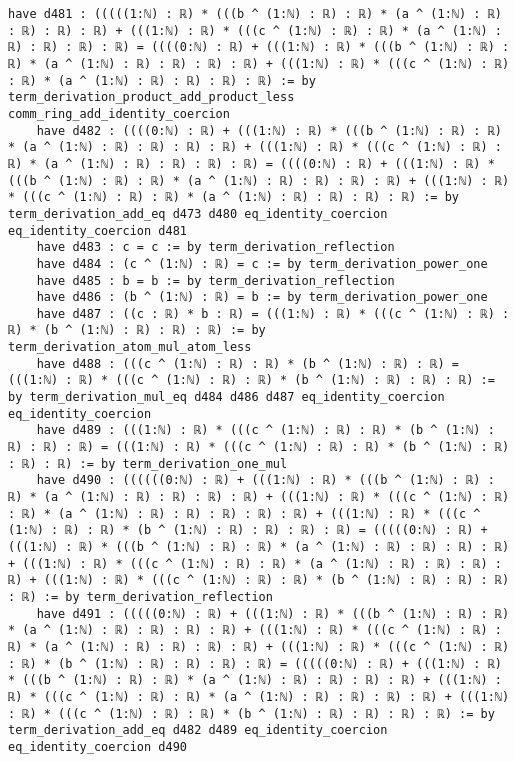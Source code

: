 \documentclass{article}
\begin{document}
\begin{tcolorbox}[colback=white!10, width=\linewidth]
\begin{lstlisting}[language=Lean4]
    have d481 : (((((1:ℕ) : ℝ) * (((b ^ (1:ℕ) : ℝ) : ℝ) * (a ^ (1:ℕ) : ℝ) : ℝ) : ℝ) : ℝ) + (((1:ℕ) : ℝ) * (((c ^ (1:ℕ) : ℝ) : ℝ) * (a ^ (1:ℕ) : ℝ) : ℝ) : ℝ) : ℝ) = ((((0:ℕ) : ℝ) + (((1:ℕ) : ℝ) * (((b ^ (1:ℕ) : ℝ) : ℝ) * (a ^ (1:ℕ) : ℝ) : ℝ) : ℝ) : ℝ) + (((1:ℕ) : ℝ) * (((c ^ (1:ℕ) : ℝ) : ℝ) * (a ^ (1:ℕ) : ℝ) : ℝ) : ℝ) : ℝ) := by term_derivation_product_add_product_less comm_ring_add_identity_coercion
    have d482 : ((((0:ℕ) : ℝ) + (((1:ℕ) : ℝ) * (((b ^ (1:ℕ) : ℝ) : ℝ) * (a ^ (1:ℕ) : ℝ) : ℝ) : ℝ) : ℝ) + (((1:ℕ) : ℝ) * (((c ^ (1:ℕ) : ℝ) : ℝ) * (a ^ (1:ℕ) : ℝ) : ℝ) : ℝ) : ℝ) = ((((0:ℕ) : ℝ) + (((1:ℕ) : ℝ) * (((b ^ (1:ℕ) : ℝ) : ℝ) * (a ^ (1:ℕ) : ℝ) : ℝ) : ℝ) : ℝ) + (((1:ℕ) : ℝ) * (((c ^ (1:ℕ) : ℝ) : ℝ) * (a ^ (1:ℕ) : ℝ) : ℝ) : ℝ) : ℝ) := by term_derivation_add_eq d473 d480 eq_identity_coercion eq_identity_coercion d481
    have d483 : c = c := by term_derivation_reflection
    have d484 : (c ^ (1:ℕ) : ℝ) = c := by term_derivation_power_one
    have d485 : b = b := by term_derivation_reflection
    have d486 : (b ^ (1:ℕ) : ℝ) = b := by term_derivation_power_one
    have d487 : ((c : ℝ) * b : ℝ) = (((1:ℕ) : ℝ) * (((c ^ (1:ℕ) : ℝ) : ℝ) * (b ^ (1:ℕ) : ℝ) : ℝ) : ℝ) := by term_derivation_atom_mul_atom_less
    have d488 : (((c ^ (1:ℕ) : ℝ) : ℝ) * (b ^ (1:ℕ) : ℝ) : ℝ) = (((1:ℕ) : ℝ) * (((c ^ (1:ℕ) : ℝ) : ℝ) * (b ^ (1:ℕ) : ℝ) : ℝ) : ℝ) := by term_derivation_mul_eq d484 d486 d487 eq_identity_coercion eq_identity_coercion
    have d489 : (((1:ℕ) : ℝ) * (((c ^ (1:ℕ) : ℝ) : ℝ) * (b ^ (1:ℕ) : ℝ) : ℝ) : ℝ) = (((1:ℕ) : ℝ) * (((c ^ (1:ℕ) : ℝ) : ℝ) * (b ^ (1:ℕ) : ℝ) : ℝ) : ℝ) := by term_derivation_one_mul
    have d490 : ((((((0:ℕ) : ℝ) + (((1:ℕ) : ℝ) * (((b ^ (1:ℕ) : ℝ) : ℝ) * (a ^ (1:ℕ) : ℝ) : ℝ) : ℝ) : ℝ) + (((1:ℕ) : ℝ) * (((c ^ (1:ℕ) : ℝ) : ℝ) * (a ^ (1:ℕ) : ℝ) : ℝ) : ℝ) : ℝ) : ℝ) + (((1:ℕ) : ℝ) * (((c ^ (1:ℕ) : ℝ) : ℝ) * (b ^ (1:ℕ) : ℝ) : ℝ) : ℝ) : ℝ) = (((((0:ℕ) : ℝ) + (((1:ℕ) : ℝ) * (((b ^ (1:ℕ) : ℝ) : ℝ) * (a ^ (1:ℕ) : ℝ) : ℝ) : ℝ) : ℝ) + (((1:ℕ) : ℝ) * (((c ^ (1:ℕ) : ℝ) : ℝ) * (a ^ (1:ℕ) : ℝ) : ℝ) : ℝ) : ℝ) + (((1:ℕ) : ℝ) * (((c ^ (1:ℕ) : ℝ) : ℝ) * (b ^ (1:ℕ) : ℝ) : ℝ) : ℝ) : ℝ) := by term_derivation_reflection
    have d491 : (((((0:ℕ) : ℝ) + (((1:ℕ) : ℝ) * (((b ^ (1:ℕ) : ℝ) : ℝ) * (a ^ (1:ℕ) : ℝ) : ℝ) : ℝ) : ℝ) + (((1:ℕ) : ℝ) * (((c ^ (1:ℕ) : ℝ) : ℝ) * (a ^ (1:ℕ) : ℝ) : ℝ) : ℝ) : ℝ) + (((1:ℕ) : ℝ) * (((c ^ (1:ℕ) : ℝ) : ℝ) * (b ^ (1:ℕ) : ℝ) : ℝ) : ℝ) : ℝ) = (((((0:ℕ) : ℝ) + (((1:ℕ) : ℝ) * (((b ^ (1:ℕ) : ℝ) : ℝ) * (a ^ (1:ℕ) : ℝ) : ℝ) : ℝ) : ℝ) + (((1:ℕ) : ℝ) * (((c ^ (1:ℕ) : ℝ) : ℝ) * (a ^ (1:ℕ) : ℝ) : ℝ) : ℝ) : ℝ) + (((1:ℕ) : ℝ) * (((c ^ (1:ℕ) : ℝ) : ℝ) * (b ^ (1:ℕ) : ℝ) : ℝ) : ℝ) : ℝ) := by term_derivation_add_eq d482 d489 eq_identity_coercion eq_identity_coercion d490

\end{lstlisting}
\end{tcolorbox}
\end{document}
